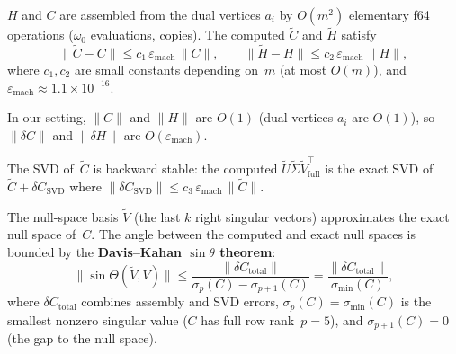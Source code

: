 \begin{lemma}\label{lem:link-assembly}
$H$ and $C$ are assembled from the dual vertices $a_i$ by
$O(m^2)$ elementary f64 operations
($\omega_0$ evaluations, copies).
The computed $\tilde C$ and $\tilde H$ satisfy
\[
  \|\tilde C - C\| \leq c_1\, \varepsilon_{\mathrm{mach}}\, \|C\|,
  \qquad
  \|\tilde H - H\| \leq c_2\, \varepsilon_{\mathrm{mach}}\, \|H\|,
\]
where $c_1, c_2$ are small constants depending on~$m$
(at most $O(m)$), and $\varepsilon_{\mathrm{mach}} \approx 1.1 \times 10^{-16}$.

In our setting, $\|C\|$ and $\|H\|$ are $O(1)$
(dual vertices $a_i$ are $O(1)$),
so $\|\delta C\|$ and $\|\delta H\|$ are $O(\varepsilon_{\mathrm{mach}})$.
\end{lemma}


\begin{lemma}\label{lem:link-svd}
The SVD of~$\tilde C$ is backward stable: the computed
$\tilde U \tilde\Sigma \tilde V_{\mathrm{full}}^\top$
is the exact SVD of $\tilde C + \delta C_{\mathrm{SVD}}$
where $\|\delta C_{\mathrm{SVD}}\| \leq c_3\, \varepsilon_{\mathrm{mach}}\, \|\tilde C\|$.

The null-space basis $\tilde V$ (the last $k$ right singular vectors)
approximates the exact null space of~$C$.
The angle between the computed and exact null spaces is bounded by
the \textbf{Davis--Kahan $\sin\theta$ theorem}:
\[
  \|\sin\Theta(\tilde V, V)\|
  \leq \frac{\|\delta C_{\mathrm{total}}\|}
       {\sigma_p(C) - \sigma_{p+1}(C)}
  = \frac{\|\delta C_{\mathrm{total}}\|}
       {\sigma_{\min}(C)},
\]
where $\delta C_{\mathrm{total}}$ combines assembly and SVD errors,
$\sigma_p(C) = \sigma_{\min}(C)$ is the smallest nonzero singular
value ($C$ has full row rank~$p = 5$),
and $\sigma_{p+1}(C) = 0$ (the gap to the null space).

\end{lemma}


